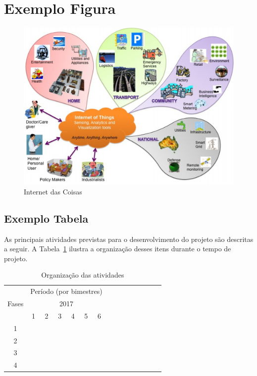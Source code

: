 \documentclass[a4paper]{article}
\newcommand{\ck}[0]
{
\checkmark
}
\begin{document}
\section{Exemplo Figura}



\begin{figure}[!htb]
\centering
\includegraphics[width=\linewidth]{img//ilustracaoiot.png}
\caption{Internet das Coisas \cite{gubbi2013internet} \label{figure1}}
\end{figure}



\subsection{Exemplo Tabela}

As principais atividades previstas para o desenvolvimento do projeto são descritas a seguir. A Tabela~\ref{tab-crono} ilustra a organização desses itens durante o tempo de projeto.

\begin{table}[ht]
\center
\caption{Organização das atividades} \label{tab-crono}
\bf
\begin{tabular}{|c|c|c|c|c|c|c|c|c|c|c|c|c|c|c|}
\hline 
\multirow{3}{*}{Fases} & \multicolumn{6}{|c|}{Período (por bimestres)} \\ 
\cline{2-7}
 & \multicolumn{6}{|c|}{{\scriptsize 2017}} \\ 
\cline{2-7}
 & {\scriptsize 1} & {\scriptsize 2} & {\scriptsize 3} & {\scriptsize 4} & {\scriptsize 5} & {\scriptsize 6} \\ 
\hline 
1 & \ck & \ck & \ck & \ck & \ck & \ck \\ 
\hline 
2 &     &     & \ck & \ck & \ck &  \\ 
\hline 
3 &     &     & \ck & \ck & \ck &  \\ 
\hline 
4 &     &     &     & \ck & \ck & \ck\\ 
\hline 
\end{tabular}
\end{table}
\end{document}
